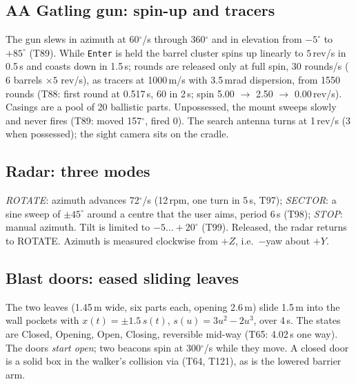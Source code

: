 \subsection{AA Gatling gun: spin-up and tracers}
The gun slews in azimuth at 60$^\circ$/s through 360$^\circ$ and in elevation from $-5^\circ$ to $+85^\circ$ (T89). While \texttt{Enter} is held the barrel
cluster spins up linearly to $5$\,rev/s in 0.5\,s and coasts down in 1.5\,s; rounds are released only at full spin, 30 rounds/s ($6$ barrels
$\times5$ rev/s), as tracers at 1000\,m/s with 3.5\,mrad dispersion, from 1550 rounds (T88: first round at
0.517\,s, 60 in 2\,s; spin 5.00 $\to$ 2.50 $\to$ 0.00\,rev/s). Casings are a pool of 20 ballistic parts. Unpossessed, the mount sweeps slowly and never fires (T89: moved 157$^\circ$, fired 0).
The search antenna turns at 1\,rev/s (3 when possessed); the sight camera sits on the cradle.

\subsection{Radar: three modes}
\emph{ROTATE}: azimuth advances 72$^\circ$/s (12\,rpm, one turn in 5\,s, T97); \emph{SECTOR}: a sine sweep of $\pm45^\circ$ around a centre
that the user aims, period 6\,s (T98); \emph{STOP}: manual azimuth. Tilt is limited to $-5\ldots+20^\circ$
(T99). Released, the radar returns to ROTATE. Azimuth is measured clockwise from $+Z$, i.e.\ $-$yaw about $+Y$.

\subsection{Blast doors: eased sliding leaves}
The two leaves (1.45\,m wide, six parts each, opening 2.6\,m) slide 1.5\,m into the wall pockets with
$x(t)=\pm1.5\,s(t)$, $s(u)=3u^2-2u^3$, over 4\,s. The states are Closed, Opening, Open, Closing, reversible mid-way
(T65: 4.02\,s one way). The doors \emph{start open}; two beacons spin at 300$^\circ$/s while they move. A closed door is a solid box in the walker's collision via
 (T64, T121), as is the lowered barrier arm.


